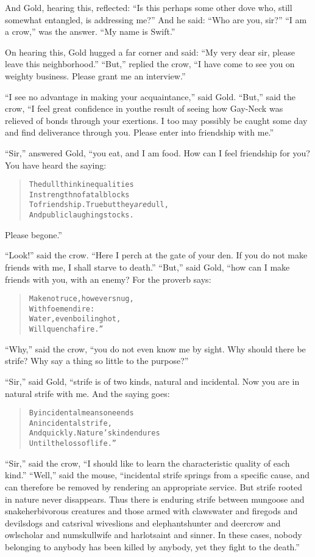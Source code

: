 \documentclass[article, twoside, 14pt]{memoir}
\renewenvironment{verbatim}{%
\begin{quote}%
\vskip -10pt%
\begin{alltt}\normalfont\large}{\end{alltt}%
\end{quote}%
\vskip -10pt
} %
\begin{document}
And Gold, hearing this, reflected:
``Is this perhaps some other dove who, still somewhat entangled, is addressing me?''
And he said: ``Who are you, sir?'' ``I am a crow,'' was the answer.
``My name is Swift.''

On hearing this, Gold hugged a far corner and said:
``My very dear sir, please leave this neighborhood.'' ``But,''
replied the crow,
``I have come to see you on weighty business. Please grant me an interview.''

``I see no advantage in making your acquaintance,'' said Gold.
``But,'' said the crow,
``I feel great confidence in you{\textemdash}the result of seeing how Gay-Neck was relieved of bonds through your exertions. I too may possibly be caught some day and find deliverance through you. Please enter into friendship with me.''

``Sir,'' answered Gold, “you eat, and I am food. How can I feel
friendship for you? You have heard the saying:

\begin{verbatim}
The dull think inequalities
    In strength no fatal blocks
To friendship. True{\textemdash}but they \emph{are} dull,
    And public laughingstocks.
\end{verbatim}
Please begone.”

``Look!'' said the crow.
``Here I perch at the gate of your den. If you do not make friends with me, I shall starve to death.''
``But,'' said Gold, “how can I make friends with you, with an
enemy? For the proverb says:

\begin{verbatim}
Make no truce, however snug,
    With foemen dire:
Water, even boiling hot,
    Will quench a fire.”
\end{verbatim}
``Why,'' said the crow,
``you do not even know me by sight. Why should there be strife? Why say a thing so little to the purpose?''

``Sir,'' said Gold, “strife is of two kinds, natural and
incidental. Now you are in natural strife with me. And the saying
goes:

\begin{verbatim}
By incidental means one ends
    An incidental strife,
And quickly. Nature's kind endures
    Until the loss of life.”
\end{verbatim}
``Sir,'' said the crow,
``I should like to learn the characteristic quality of each kind.''
``Well,'' said the mouse,
``incidental strife springs from a specific cause, and can therefore be removed by rendering an appropriate service. But strife rooted in nature never disappears. Thus there is enduring strife between mungoose and snake{\textemdash}herbivorous creatures and those armed with claws{\textemdash}water and fire{\textemdash}gods and devils{\textemdash}dogs and cats{\textemdash}rival wives{\textemdash}lions and elephants{\textemdash}hunter and deer{\textemdash}crow and owl{\textemdash}scholar and numskull{\textemdash}wife and harlot{\textemdash}saint and sinner. In these cases, nobody belonging to anybody has been killed by anybody, yet they fight to the death.''
\end{document}
